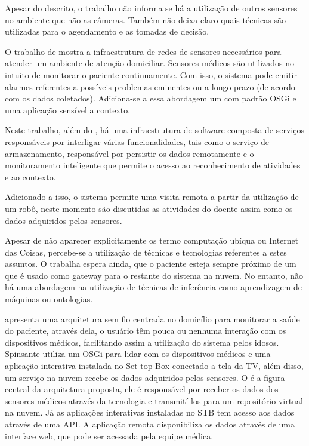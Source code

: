 Apesar do descrito, o trabalho não informa se há a utilização de outros
sensores no ambiente que não as câmeras. Também não deixa claro quais
técnicas são utilizadas para o agendamento e as tomadas de decisão.

O trabalho de  mostra a infraestrutura de redes
de sensores necessários para atender um ambiente de atenção domiciliar.
Sensores médicos são utilizados no intuito de monitorar o paciente
continuamente. Com isso, o sistema pode emitir alarmes referentes a possíveis
problemas eminentes ou a longo prazo (de acordo com os dados coletados).
Adiciona-se a essa abordagem um \middleware[] com padrão OSGi e uma aplicação
sensível a contexto.

Neste trabalho, além do \middleware, há uma infraestrutura de software composta
de serviços responsáveis por interligar várias funcionalidades, tais como o
serviço de armazenamento, responsável por persistir os dados remotamente e o
monitoramento inteligente que permite o acesso ao reconhecimento de atividades
e ao contexto.  

Adicionado a isso, o sistema permite uma visita remota a partir da utilização
de um robô, neste momento são discutidas as atividades do doente assim como os
dados adquiridos pelos sensores.

Apesar de não aparecer explicitamente os termo computação ubíqua ou Internet
das Coisas, percebe-se a utilização de técnicas e tecnologias referentes a
estes assuntos. O trabalha espera ainda, que o paciente esteja sempre próximo
de um \smartphone[] que é usado como gateway para o restante do sistema na nuvem.
No entanto, não há uma abordagem na utilização de técnicas de inferência como
aprendizagem de máquinas ou ontologias.

 apresenta uma arquitetura sem fio centrada no
domicílio para monitorar a saúde do paciente, através dela, o usuário têm pouca
ou nenhuma interação com os dispositivos médicos, facilitando assim a
utilização do sistema pelos idosos. Spinsante utiliza um \framework[] OSGi para
lidar com os dispositivos médicos e uma aplicação interativa instalada no
Set-top Box conectado a tela da TV, além disso, um serviço na nuvem recebe os
dados adquiridos pelos sensores. O \gateway[] é a figura central da arquitetura
proposta, ele é responsável por receber os dados dos sensores médicos através
da tecnologia \bluetooth[] e transmití-los para um repositório virtual na nuvem.
Já as aplicações interativas instaladas no STB tem acesso aos dados através de
uma API. A aplicação remota disponibiliza os dados através de uma interface
web, que pode ser acessada pela equipe médica.

